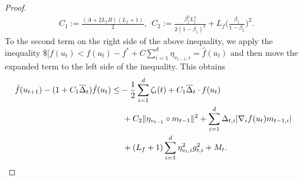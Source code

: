 \documentclass{article} %
\begin{document}
\begin{proof}
\begin{align}\label{adam_20}
&C_{1}:=\frac{(A+2L_{f}B)(L_{f}+1)}{2},\ \ C_{2}:=\frac{\beta_{1}^{2}L_{f}^{2}}{2(1-\beta_{1})^{2}}+L_{f}\Big(\frac{\beta_{1}}{1-\beta_{1}}\Big)^{2}.
\end{align}
To the second term on the right side of the above inequality, we apply the inequality $\$[f(u_{t}) < f(u_{t})-f^* + C\sum_{i=1}^{d}\eta_{v_{t-1},i}=\hat{f}(u_{t})$ and then move the expanded term to the left side of the inequality. This obtains
\begin{align*}
\hat{f}(u_{t+1})-(1+C_{1}\overline{\Delta}_{t})\hat{f}(u_{t})\le& -\frac{1}{2}\sum_{i=1}^{d}\zeta_{i}(t)+C_{1}\overline{\Delta}_{t}\cdot f(u_{t})\notag\\&\ +C_{2}\|{\eta_{v_{t-1}}}\circ m_{t-1}\|^{2}+\sum_{i=1}^{d}\Delta_{t,i}|\nabla_{i} f(u_{t})m_{t-1,i}|\\&\ +(L_{f}+1)\sum_{i=1}^{d}\eta_{v_{t},i}^{2}g_{t,i}^{2}+M_{t}.
\end{align*}

\end{proof}
\end{document}
